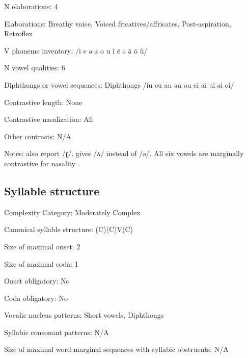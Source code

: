 {\begin{appendixdesc}
\item[N elaborations:] 4

\item[Elaborations:] Breathy voice, Voiced fricatives/affricates, Post-aspiration, Retroflex

\item[V phoneme inventory:] /i e ə a o u ĩ ẽ ə ã õ ũ/

\item[N vowel qualities:] 6

\item[Diphthongs or vowel sequences:] Diphthongs /iu eu au əu ou ei ai ui əi oi/

\item[Contrastive length:] None

\item[Contrastive nasalization:] All

\item[Other contrasts:] N/A

\item[Notes:] \citet{KotapishKotapish1973} also report /ɽ/. \citet{Paudyal2003} gives /ʌ/ instead of /ə/. All six vowels are marginally contrastive for nasality \citep[7]{Dhakal2012}.
\end{appendixdesc}
\subsection*{Syllable structure}
\begin{appendixdesc}

\item[Complexity Category:] Moderately Complex

\item[Canonical syllable structure:] (C)(C)V(C) \citep[17--20]{Dhakal2012}

\item[Size of maximal onset:] 2

\item[Size of maximal coda:] 1

\item[Onset obligatory:] No

\item[Coda obligatory:] No

\item[Vocalic nucleus patterns:] Short vowels, Diphthongs

\item[Syllabic consonant patterns:] N/A

\item[Size of maximal word-marginal sequences with syllabic obstruents:] N/A


\end{appendixdesc}}
